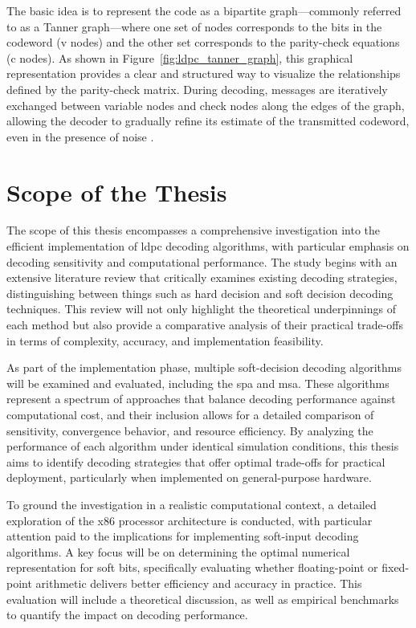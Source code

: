 \documentclass[../main.tex]{subfiles}
\begin{document}
The basic idea is to represent the code as a bipartite graph—commonly referred to as a Tanner graph—where one set of nodes corresponds to the bits in the codeword (v nodes) and the other set corresponds to the parity-check equations (c nodes).
As shown in Figure~\ref{fig:ldpc_tanner_graph}, this graphical representation provides a clear and structured way to visualize the relationships defined by the parity-check matrix.
During decoding, messages are iteratively exchanged between variable nodes and check nodes along the edges of the graph, allowing the decoder to gradually refine its estimate of the transmitted codeword, even in the presence of noise \cite{cc09}.

\section{Scope of the Thesis}
\label{sec:scope}

The scope of this thesis encompasses a comprehensive investigation into the efficient implementation of \gls{ldpc} decoding algorithms, with particular emphasis on decoding sensitivity and computational performance.
The study begins with an extensive literature review that critically examines existing decoding strategies, distinguishing between things such as hard decision and soft decision decoding techniques.
This review will not only highlight the theoretical underpinnings of each method but also provide a comparative analysis of their practical trade-offs in terms of complexity, accuracy, and implementation feasibility.

As part of the implementation phase, multiple soft-decision decoding algorithms will be examined and evaluated, including the \gls{spa} and \gls{msa}.
These algorithms represent a spectrum of approaches that balance decoding performance against computational cost, and their inclusion allows for a detailed comparison of sensitivity, convergence behavior, and resource efficiency.
By analyzing the performance of each algorithm under identical simulation conditions, this thesis aims to identify decoding strategies that offer optimal trade-offs for practical deployment, particularly when implemented on general-purpose hardware.

To ground the investigation in a realistic computational context, a detailed exploration of the x86 processor architecture is conducted, with particular attention paid to the implications for implementing soft-input decoding algorithms.
A key focus will be on determining the optimal numerical representation for soft bits, specifically evaluating whether floating-point or fixed-point arithmetic delivers better efficiency and accuracy in practice.
This evaluation will include a theoretical discussion, as well as empirical benchmarks to quantify the impact on decoding performance.
\end{document}
